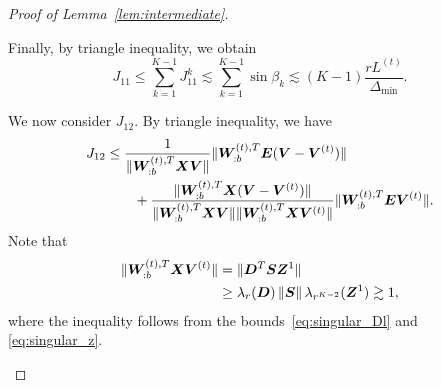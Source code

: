 \documentclass[journal]{IEEEtran}
\theoremstyle{definition}
\theoremstyle{definition}
\begin{document}
\begin{proof}[Proof of Lemma~\ref{lem:intermediate}]
\begin{enumerate}[wide]
    
       Finally, by triangle inequality, we obtain
    \begin{equation}\label{eq:j1}
        J_{11} \leq \sum_{k = 1}^{K-1} J_{11}^k \lesssim  \sum_{k = 1}^{K-1} \sin \beta_k  \lesssim (K-1)\frac{r L^{(t)}}{\Delta_{\min}}.
    \end{equation}
    

    
    We now consider $J_{12}$. By triangle inequality, we have 
    \begin{align}
        J_{12} &\leq \frac{ 1}{\lVert\bm{W}_{:b}^{(t),T} \bm X \bm{V} \rVert} \lVert\bm{W}_{:b}^{(t),T} \bm{E} (\bm{V}-\bm{V}^{(t)})\rVert  \\
        & \quad \quad +
        \frac{ \lVert\bm{W}_{:b}^{(t),T} \bm X (\bm{V}-\bm{V}^{(t)})\rVert }{\lVert\bm{W}_{:b}^{(t),T} \bm X \bm{V} \rVert\lVert\bm{W}_{:b}^{(t),T} \bm X \bm{V}^{(t)} \rVert} \lVert\bm{W}_{:b}^{(t),T} \bm{E} \bm{V}^{(t)} \rVert.
    \end{align}
     Note that 
     \begin{align}
          \onormSize{}{\mW_{:b}^{(t),T} \mX \mV^{(t)}} &= \onormSize{}{\mD^T \mS \mZ^1} 
          \\ &\geq \lambda_r(\mD) \onorm{\mS} \lambda_{r^{K-2}}(\mZ^1) \gtrsim 1, \label{eq:j11_wxvt}
     \end{align}
    where the inequality follows from the bounds~\eqref{eq:singular_Dl} and \eqref{eq:singular_z}.
    

\end{enumerate}
\end{proof}
\end{document}
